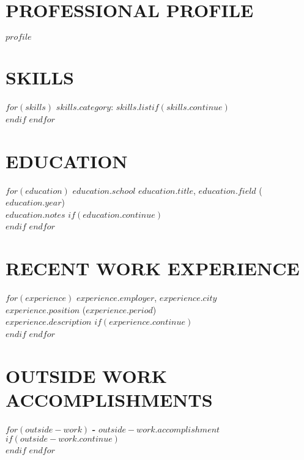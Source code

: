 \documentclass[a4paper, line, 11pt]{res} %
\begin{document}
 
 
\address{$if(contact.address)$$contact.address$\\$endif$$if(contact.telephone)$Tel: $contact.telephone$$endif$}        
\address{$if(contact.email)$E-mail: $contact.email$$endif$$if(contact.url)$\\ URL: $contact.url$$endif$$if(contact.extra)$$contact.extra$$endif$}
  
                        
\begin{resume}                         
 
\section{PROFESSIONAL PROFILE}  
  $profile$ 

\section{SKILLS}  

$for(skills)$
    \textbf{$skills.category$}: $skills.list$$if(skills.continue)$\\$endif$
$endfor$

\section{EDUCATION} 

$for(education)$
    \textbf{\uppercase{$education.school$}} \emph{$education.title$}, $education.field$ ($education.year$)\\ $education.notes$ $if(education.continue)$\\$endif$
$endfor$

  

\section{RECENT WORK EXPERIENCE}
$for(experience)$
    \textbf{\uppercase{$experience.employer$}}, $experience.city$ \\ \emph{$experience.position$} ($experience.period$)\\ $experience.description$ $if(experience.continue)$\\$endif$
$endfor$


\section{OUTSIDE WORK ACCOMPLISHMENTS}  

$for(outside-work)$
\textbf{-} $outside-work.accomplishment$$if(outside-work.continue)$\\$endif$
$endfor$
\end{resume}
\end{document}
